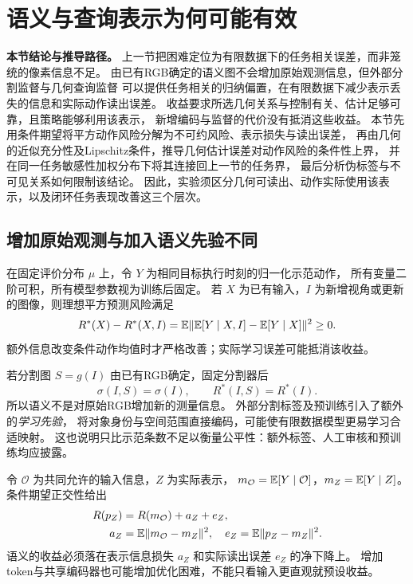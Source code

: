 \section{语义与查询表示为何可能有效}
\noindent\textbf{本节结论与推导路径。}
上一节把困难定位为有限数据下的任务相关误差，而非笼统的像素信息不足。
由已有RGB确定的语义图不会增加原始观测信息，但外部分割监督与几何查询监督
可以提供任务相关的归纳偏置，在有限数据下减少表示丢失的信息和实际动作读出误差。
收益要求所选几何关系与控制有关、估计足够可靠，且策略能够利用该表示，
新增编码与监督的代价没有抵消这些收益。
本节先用条件期望将平方动作风险分解为不可约风险、表示损失与读出误差，
再由几何的近似充分性及Lipschitz条件，推导几何估计误差对动作风险的条件性上界，
并在同一任务敏感性加权分布下将其连接回上一节的任务界，
最后分析伪标签与不可见关系如何限制该结论。
因此，实验须区分几何可读出、动作实际使用该表示，以及闭环任务表现改善这三个层次。

\subsection{增加原始观测与加入语义先验不同}
在固定评价分布 $\mu$ 上，令 $Y$ 为相同目标执行时刻的归一化示范动作，
所有变量二阶可积，所有模型参数视为训练后固定。
若 $X$ 为已有输入，$I$ 为新增视角或更新的图像，则理想平方预测风险满足
\begin{equation}
 R^*(X)-R^*(X,I)
 =\mathbb E\lVert\mathbb E[Y\mid X,I]-\mathbb E[Y\mid X]\rVert^2\ge0.
 \label{eq:newinfo}
\end{equation}
额外信息改变条件动作均值时才严格改善；实际学习误差可能抵消该收益。

若分割图 $S=g(I)$ 由已有RGB确定，固定分割器后
\begin{equation}
 \sigma(I,S)=\sigma(I),\qquad R^*(I,S)=R^*(I).
 \label{eq:semanticinfo}
\end{equation}
所以语义不是对原始RGB增加新的测量信息。
外部分割标签及预训练引入了额外的\emph{学习先验}，
将对象身份与空间范围直接编码，可能使有限数据模型更易学习合适映射。
这也说明只比示范条数不足以衡量公平性：额外标签、人工审核和预训练均应披露。

令 $\mathcal O$ 为共同允许的输入信息，$Z$ 为实际表示，
$m_{\mathcal O}=\mathbb E[Y\mid\mathcal O]$，$m_Z=\mathbb E[Y\mid Z]$。
条件期望正交性给出
\begin{align}
 R(p_Z)&=R(m_{\mathcal O})+a_Z+e_Z,\label{eq:decomp}\\
 a_Z&=\mathbb E\lVert m_{\mathcal O}-m_Z\rVert^2,\quad
 e_Z=\mathbb E\lVert p_Z-m_Z\rVert^2.\nonumber
\end{align}
语义的收益必须落在表示信息损失 $a_Z$ 和实际读出误差 $e_Z$ 的净下降上。
增加token与共享编码器也可能增加优化困难，不能只看输入更直观就预设收益。

